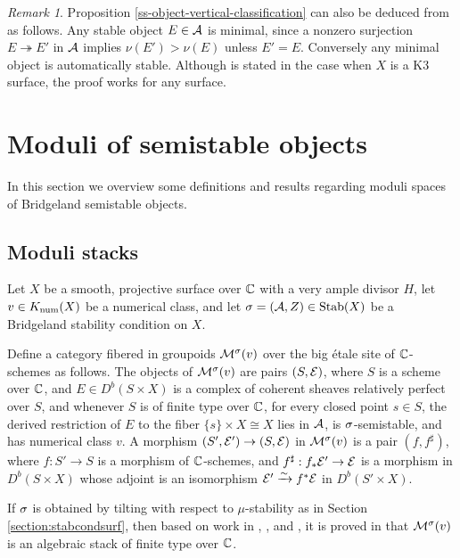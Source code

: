 \documentclass[letterpaper,12pt]{amsart}
\theoremstyle{remark}
\newtheorem{rmk}[thm]{Remark}
\begin{document}
\begin{rmk}
Proposition \ref{ss-object-vertical-classification} can also be deduced from \cite[Proposition 2.2]{huy} as follows. Any stable object $E \in \mathcal{A}$ is minimal, since a nonzero surjection $E \twoheadrightarrow E'$ in $\mathcal{A}$ implies $\nu(E') > \nu(E)$ unless $E' = E$. Conversely any minimal object is automatically stable. Although \cite[Proposition 2.2]{huy} is stated in the case when $X$ is a K3 surface, the proof works for any surface.
\end{rmk}


\section{Moduli of semistable objects}
In this section we overview some definitions and results regarding moduli spaces of Bridgeland semistable objects. 

\subsection{Moduli stacks}
Let $X$ be a smooth, projective surface over $\mathbb{C}$ with a very ample divisor $H$, let $v \in K_{\mathrm{num}}(X)$ be a numerical class, and let $\sigma = (\mathcal{A}, Z) \in \operatorname{\mathrm{Stab}}(X)$ be a Bridgeland stability condition on $X$.

Define a category fibered in groupoids $\mathcal{M}^\sigma(v)$ over the big \'etale site of $\mathbb{C}$-schemes as follows. The objects of $\mathcal{M}^\sigma(v)$ are pairs $(S, \mathcal{E})$, where $S$ is a scheme over $\mathbb{C}$, and $E \in D^b(S \times X)$ is a complex of coherent sheaves relatively perfect over $S$, and whenever $S$ is of finite type over $\mathbb{C}$, for every closed point $s \in S$, the derived restriction of $E$ to the fiber $\{s\} \times X \cong X$ lies in $\mathcal{A}$, is $\sigma$-semistable, and has numerical class $v$. A morphism $(S', \mathcal{E}') \to (S, \mathcal{E})$ in $\mathcal{M}^\sigma(v)$ is a pair $(f, f^\sharp)$, where $f: S' \to S$ is a morphism of $\mathbb{C}$-schemes, and $f^\sharp: f_* \mathcal{E}' \to \mathcal{E}$ is a morphism in $D^b(S \times X)$ whose adjoint is an isomorphism $\mathcal{E}' \xrightarrow{\sim} f^* \mathcal{E}$ in $D^b(S' \times X)$.

If $\sigma$ is obtained by tilting with respect to $\mu$-stability as in Section \ref{section:stabcondsurf}, then based on work in \cite{lie06}, \cite{ABL13}, and \cite{AP06}, it is proved in \cite{toda08} that $\mathcal{M}^\sigma(v)$ is an algebraic stack of finite type over $\mathbb{C}$. 
\end{document}
